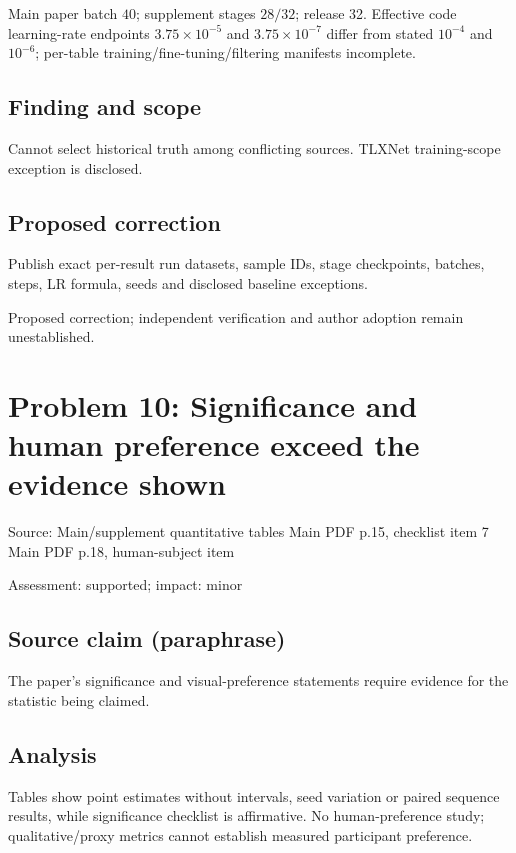 \documentclass[11pt]{article}
\begin{document}
Main paper batch \(40\); supplement stages \(28/32\); release 32. Effective code learning-rate endpoints \(3.75\times10^{-5}\) and \(3.75\times10^{-7}\) differ from stated \(10^{-4}\) and \(10^{-6}\); per-table training/fine-tuning/filtering manifests incomplete.

\subsection*{Finding and scope}

Cannot select historical truth among conflicting sources. TLXNet training-scope exception is disclosed.

\subsection*{Proposed correction}

Publish exact per-result run datasets, sample IDs, stage checkpoints, batches, steps, LR formula, seeds and disclosed baseline exceptions.

Proposed correction; independent verification and author adoption remain unestablished.

\section*{Problem 10: Significance and human preference exceed the evidence shown}

Source: Main/supplement quantitative tables Main PDF p.15, checklist item 7 Main PDF p.18, human-subject item

Assessment: supported; impact: minor

\subsection*{Source claim (paraphrase)}

The paper's significance and visual-preference statements require evidence for the statistic being claimed.

\subsection*{Analysis}

Tables show point estimates without intervals, seed variation or paired sequence results, while significance checklist is affirmative. No human-preference study; qualitative/proxy metrics cannot establish measured participant preference.
\end{document}
